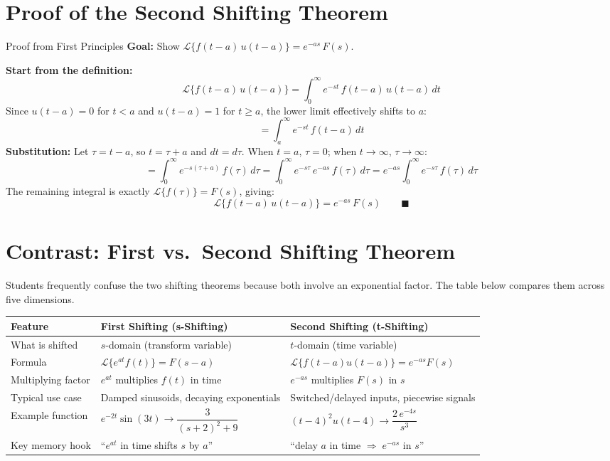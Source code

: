 \documentclass[12pt,a4paper]{article}
\begin{document}
\section{Proof of the Second Shifting Theorem}

\begin{infobox}{Proof from First Principles}
\textbf{Goal:} Show $\mathcal{L}\{f(t-a)\,u(t-a)\} = e^{-as}\,F(s)$.

\textbf{Start from the definition:}
\[
  \mathcal{L}\{f(t-a)\,u(t-a)\}
  = \int_0^{\infty} e^{-st}\,f(t-a)\,u(t-a)\,dt
\]
Since $u(t-a) = 0$ for $t < a$ and $u(t-a) = 1$ for $t \geq a$, the lower limit
effectively shifts to $a$:
\[
  = \int_a^{\infty} e^{-st}\,f(t-a)\,dt
\]
\textbf{Substitution:} Let $\tau = t - a$, so $t = \tau + a$ and $dt = d\tau$.
When $t = a$, $\tau = 0$; when $t \to \infty$, $\tau \to \infty$:
\[
  = \int_0^{\infty} e^{-s(\tau + a)}\,f(\tau)\,d\tau
  = \int_0^{\infty} e^{-s\tau}\,e^{-as}\,f(\tau)\,d\tau
  = e^{-as}\int_0^{\infty} e^{-s\tau}\,f(\tau)\,d\tau
\]
The remaining integral is exactly $\mathcal{L}\{f(\tau)\} = F(s)$, giving:
\[
  \mathcal{L}\{f(t-a)\,u(t-a)\} = e^{-as}\,F(s) \qquad \blacksquare
\]
\end{infobox}

\section{Contrast: First vs.\ Second Shifting Theorem}

Students frequently confuse the two shifting theorems because both involve
an exponential factor.
The table below compares them across five dimensions.

\begin{center}
\begin{tabular}{@{}lll@{}}
\toprule
\textbf{Feature} & \textbf{First Shifting (s-Shifting)} & \textbf{Second Shifting (t-Shifting)} \\
\midrule
What is shifted & $s$-domain (transform variable) & $t$-domain (time variable) \\
\addlinespace
Formula & $\mathcal{L}\{e^{at}f(t)\} = F(s-a)$ & $\mathcal{L}\{f(t-a)u(t-a)\} = e^{-as}F(s)$ \\
\addlinespace
Multiplying factor & $e^{at}$ multiplies $f(t)$ in time & $e^{-as}$ multiplies $F(s)$ in $s$ \\
\addlinespace
Typical use case & Damped sinusoids, decaying exponentials & Switched/delayed inputs, piecewise signals \\
\addlinespace
Example function & $e^{-2t}\sin(3t) \to \dfrac{3}{(s+2)^2+9}$ & $(t-4)^2 u(t-4) \to \dfrac{2\,e^{-4s}}{s^3}$ \\
\addlinespace
Key memory hook & ``$e^{at}$ in time shifts $s$ by $a$'' & ``delay $a$ in time $\Rightarrow\; e^{-as}$ in $s$'' \\
\bottomrule
\end{tabular}
\end{center}
\end{document}
